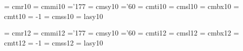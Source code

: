  \font\elvrm  = cmr10    \@halfmag %
 \font\elvmi  = cmmi10   \@halfmag %
    \skewchar\elvmi ='177          %
 \font\elvsy  = cmsy10   \@halfmag %
    \skewchar\elvsy ='60           %
 \font\elvit  = cmti10   \@halfmag %
 \font\elvsl  = cmsl10   \@halfmag %
 \font\elvbf  = cmbx10   \@halfmag %
 \font\elvtt  = cmtt10   \@halfmag %
    \hyphenchar\elvtt = -1         %
 \font\elvsf  = cmss10   \@halfmag %
 \font\elvly  = lasy10  \@halfmag %
 
 \font\twlrm  = cmr12                 %
 \font\twlmi  = cmmi12               %
    \skewchar\twlmi ='177          %
 \font\twlsy  = cmsy10    %
    \skewchar\twlsy ='60           %
 \font\twlit  = cmti12               %
 \font\twlsl  = cmsl12               %
 \font\twlbf  = cmbx12               %
 \font\twltt  = cmtt12               %
    \hyphenchar\twltt = -1         %
 \font\twlsf  = cmss12               %
 \font\twlly  = lasy10   %
 
